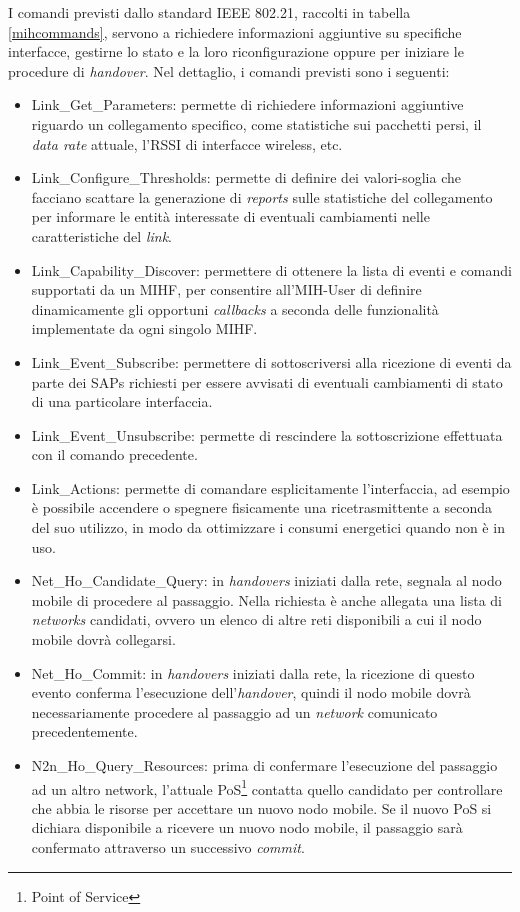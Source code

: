 I comandi previsti dallo standard IEEE 802.21, raccolti in tabella \ref{mihcommands}, servono a richiedere informazioni aggiuntive su specifiche interfacce, gestirne lo stato e la loro riconfigurazione oppure per iniziare le procedure di {\em handover}. Nel dettaglio, i comandi previsti sono i seguenti:
\begin{itemize}
\item Link\_Get\_Parameters: permette di richiedere informazioni aggiuntive riguardo un collegamento specifico, come statistiche sui pacchetti persi, il {\em data rate} attuale, l'RSSI di interfacce wireless, etc.
\item Link\_Configure\_Thresholds: permette di definire dei valori-soglia che facciano scattare la generazione di {\em reports} sulle statistiche del collegamento per informare le entità interessate di eventuali cambiamenti nelle caratteristiche del {\em link}.
\item Link\_Capability\_Discover: permettere di ottenere la lista di eventi e comandi supportati da un MIHF, per consentire all'MIH-User di definire dinamicamente gli opportuni {\em callbacks} a seconda delle funzionalità implementate da ogni singolo MIHF.
\item Link\_Event\_Subscribe: permettere di sottoscriversi alla ricezione di eventi da parte dei SAPs richiesti per essere avvisati di eventuali cambiamenti di stato di una particolare interfaccia.
\item Link\_Event\_Unsubscribe: permette di rescindere la sottoscrizione effettuata con il comando precedente.
\item Link\_Actions: permette di comandare esplicitamente l'interfaccia, ad esempio è possibile accendere o spegnere fisicamente una ricetrasmittente a seconda del suo utilizzo, in modo da ottimizzare i consumi energetici quando non è in uso.
\item Net\_Ho\_Candidate\_Query: in {\em handovers} iniziati dalla rete, segnala al nodo mobile di procedere al passaggio. Nella richiesta è anche allegata una lista di {\em networks} candidati, ovvero un elenco di altre reti disponibili a cui il nodo mobile dovrà collegarsi.
\item Net\_Ho\_Commit: in {\em handovers} iniziati dalla rete, la ricezione di questo evento conferma l'esecuzione dell'{\em handover}, quindi il nodo mobile dovrà necessariamente procedere al passaggio ad un {\em network} comunicato precedentemente.
\item N2n\_Ho\_Query\_Resources: prima di confermare l'esecuzione del passaggio ad un altro network, l'attuale PoS\footnote{Point of Service} contatta quello candidato per controllare che abbia le risorse per accettare un nuovo nodo mobile. Se il nuovo PoS si dichiara disponibile a ricevere un nuovo nodo mobile, il passaggio sarà confermato attraverso un successivo {\em commit}.

\end{itemize}

